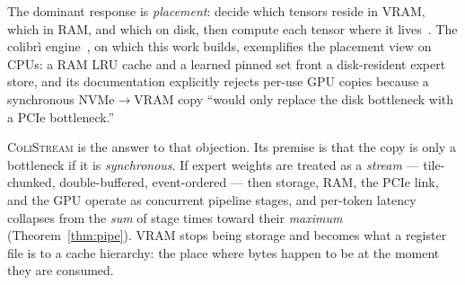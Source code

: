 \documentclass[11pt]{article}
\theoremstyle{definition}
\theoremstyle{remark}
\newcommand{\colistream}{\textsc{ColiStream}}
\begin{document}
The dominant response is \emph{placement}: decide which tensors reside in
VRAM, which in RAM, and which on disk, then compute each tensor where it
lives~\citep{sheng2023flexgen,aminabadi2022deepspeed,ren2021zerooffload}.
The colibr\`i engine~\citep{colibri2026}, on which this work builds,
exemplifies the placement view on CPUs: a RAM LRU cache and a learned pinned
set front a disk-resident expert store, and its documentation explicitly
rejects per-use GPU copies because a synchronous NVMe$\to$VRAM copy ``would
only replace the disk bottleneck with a PCIe bottleneck.''

\colistream{} is the answer to that objection. Its premise is that the copy
is only a bottleneck if it is \emph{synchronous}. If expert weights are
treated as a \emph{stream} --- tile-chunked, double-buffered, event-ordered
--- then storage, RAM, the PCIe link, and the GPU operate as concurrent
pipeline stages, and per-token latency collapses from the \emph{sum} of stage
times toward their \emph{maximum} (Theorem~\ref{thm:pipe}). VRAM stops being
storage and becomes what a register file is to a cache hierarchy: the place
where bytes happen to be at the moment they are consumed.
\end{document}
